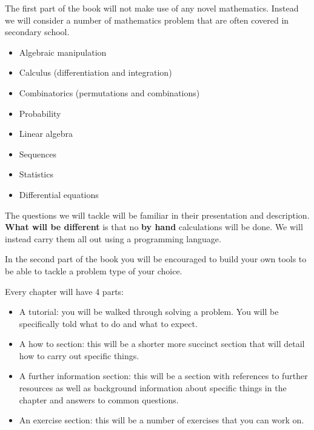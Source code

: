 The first part of the book will not make use of any novel mathematics.
Instead we will consider a number of mathematics problem that are often covered
in secondary school.

\begin{itemize}
    \item Algebraic manipulation
    \item Calculus (differentiation and integration)
    \item Combinatorics (permutations and combinations)
    \item Probability
    \item Linear algebra
    \item Sequences
    \item Statistics
    \item Differential equations
\end{itemize}

The questions we will tackle will be familiar in their presentation and
description. \textbf{What will be different} is that no \textbf{by hand} calculations will
be done. We will instead carry them all out using a programming language.

In the second part of the book you will be encouraged to build your own tools
to be able to tackle a problem type of your choice.

Every chapter will have 4 parts:

\begin{itemize}
\item A tutorial: you will be walked through solving a problem. You will be
specifically told what to do and what to expect.

\item A how to section: this will be a shorter more succinct section that will
detail how to carry out specific things.

\item 
A further information section: this will be a section with references to
further resources as well as background information about specific things in
the chapter and answers to common questions.

\item
An exercise section: this will be a number of exercises that you can work on.

\end{itemize}


